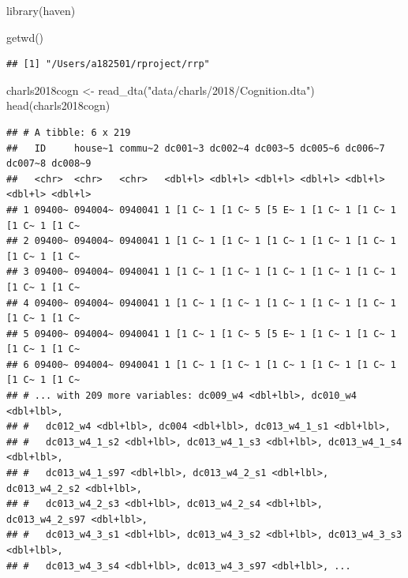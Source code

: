 \documentclass[
  oneside]{book}
\newenvironment{Shaded}{\begin{snugshade}}{\end{snugshade}}
\newcommand{\FunctionTok}[1]{\textcolor[rgb]{0.00,0.00,0.00}{#1}}
\newcommand{\NormalTok}[1]{#1}
\newcommand{\OtherTok}[1]{\textcolor[rgb]{0.56,0.35,0.01}{#1}}
\newcommand{\StringTok}[1]{\textcolor[rgb]{0.31,0.60,0.02}{#1}}
\begin{document}
\begin{Shaded}
\begin{Highlighting}[]
\FunctionTok{library}\NormalTok{(haven)}
\end{Highlighting}
\end{Shaded}

\begin{Shaded}
\begin{Highlighting}[]
\FunctionTok{getwd}\NormalTok{()}
\end{Highlighting}
\end{Shaded}

\begin{verbatim}
## [1] "/Users/a182501/rproject/rrp"
\end{verbatim}

\begin{Shaded}
\begin{Highlighting}[]
\NormalTok{charls2018cogn }\OtherTok{\textless{}{-}} \FunctionTok{read\_dta}\NormalTok{(}\StringTok{"data/charls/2018/Cognition.dta"}\NormalTok{)}
\FunctionTok{head}\NormalTok{(charls2018cogn)}
\end{Highlighting}
\end{Shaded}

\begin{verbatim}
## # A tibble: 6 x 219
##   ID     house~1 commu~2 dc001~3 dc002~4 dc003~5 dc005~6 dc006~7 dc007~8 dc008~9
##   <chr>  <chr>   <chr>   <dbl+l> <dbl+l> <dbl+l> <dbl+l> <dbl+l> <dbl+l> <dbl+l>
## 1 09400~ 094004~ 0940041 1 [1 C~ 1 [1 C~ 5 [5 E~ 1 [1 C~ 1 [1 C~ 1 [1 C~ 1 [1 C~
## 2 09400~ 094004~ 0940041 1 [1 C~ 1 [1 C~ 1 [1 C~ 1 [1 C~ 1 [1 C~ 1 [1 C~ 1 [1 C~
## 3 09400~ 094004~ 0940041 1 [1 C~ 1 [1 C~ 1 [1 C~ 1 [1 C~ 1 [1 C~ 1 [1 C~ 1 [1 C~
## 4 09400~ 094004~ 0940041 1 [1 C~ 1 [1 C~ 1 [1 C~ 1 [1 C~ 1 [1 C~ 1 [1 C~ 1 [1 C~
## 5 09400~ 094004~ 0940041 1 [1 C~ 1 [1 C~ 5 [5 E~ 1 [1 C~ 1 [1 C~ 1 [1 C~ 1 [1 C~
## 6 09400~ 094004~ 0940041 1 [1 C~ 1 [1 C~ 1 [1 C~ 1 [1 C~ 1 [1 C~ 1 [1 C~ 1 [1 C~
## # ... with 209 more variables: dc009_w4 <dbl+lbl>, dc010_w4 <dbl+lbl>,
## #   dc012_w4 <dbl+lbl>, dc004 <dbl+lbl>, dc013_w4_1_s1 <dbl+lbl>,
## #   dc013_w4_1_s2 <dbl+lbl>, dc013_w4_1_s3 <dbl+lbl>, dc013_w4_1_s4 <dbl+lbl>,
## #   dc013_w4_1_s97 <dbl+lbl>, dc013_w4_2_s1 <dbl+lbl>, dc013_w4_2_s2 <dbl+lbl>,
## #   dc013_w4_2_s3 <dbl+lbl>, dc013_w4_2_s4 <dbl+lbl>, dc013_w4_2_s97 <dbl+lbl>,
## #   dc013_w4_3_s1 <dbl+lbl>, dc013_w4_3_s2 <dbl+lbl>, dc013_w4_3_s3 <dbl+lbl>,
## #   dc013_w4_3_s4 <dbl+lbl>, dc013_w4_3_s97 <dbl+lbl>, ...
\end{verbatim}
\end{document}
